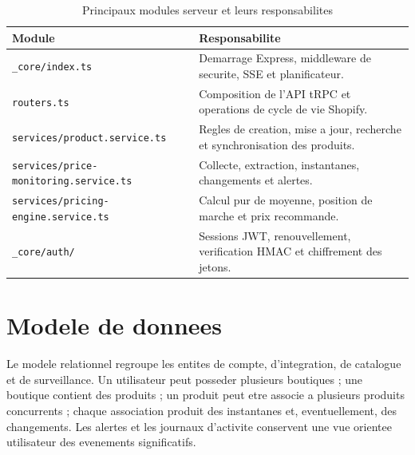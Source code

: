 \documentclass[12pt,a4paper,oneside]{report}
\begin{document}
\begin{table}[H]
\centering
\caption{Principaux modules serveur et leurs responsabilites}
\label{tab:server-modules}
\begin{tabularx}{\textwidth}{p{}Y}
\toprule
\textbf{Module} & \textbf{Responsabilite} \\
\midrule
\texttt{\_core/index.ts} & Demarrage Express, middleware de securite, SSE et planificateur. \\
\texttt{routers.ts} & Composition de l'API tRPC et operations de cycle de vie Shopify. \\
\texttt{services/product.service.ts} & Regles de creation, mise a jour, recherche et synchronisation des produits. \\
\texttt{services/price-monitoring.service.ts} & Collecte, extraction, instantanes, changements et alertes. \\
\texttt{services/pricing-engine.service.ts} & Calcul pur de moyenne, position de marche et prix recommande. \\
\texttt{\_core/auth/} & Sessions JWT, renouvellement, verification HMAC et chiffrement des jetons. \\
\bottomrule
\end{tabularx}
\end{table}

\section{Modele de donnees}
Le modele relationnel regroupe les entites de compte, d'integration, de catalogue et de surveillance. Un utilisateur peut posseder plusieurs boutiques ; une boutique contient des produits ; un produit peut etre associe a plusieurs produits concurrents ; chaque association produit des instantanes et, eventuellement, des changements. Les alertes et les journaux d'activite conservent une vue orientee utilisateur des evenements significatifs.
\end{document}
